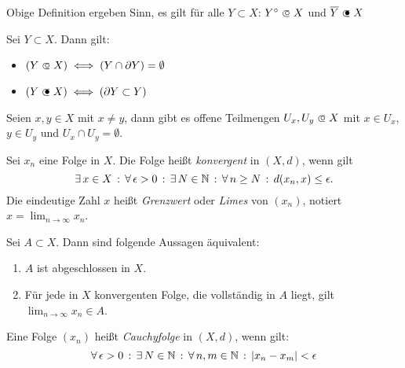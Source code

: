 \documentclass{cheat-sheet}
\begin{document}
\begin{satz}
  Obige Definition ergeben Sinn, \dh{} es gilt für alle $Y \subset X$: $Y^{\circ} \opn X$ und $\overline{Y} \cls X$
\end{satz}


\begin{satz}
  Sei $Y \subset X$. Dann gilt:
  \begin{multicols}{2}
    \begin{itemize}
      \item $(Y \opn X) \iff (Y \cap \partial Y) = \emptyset$
      \item $(Y \cls X) \iff (\partial Y \subset Y)$
    \end{itemize}
  \end{multicols}
\end{satz}

\begin{satz}
  Seien $x, y \in X$ mit $x \not= y$, dann gibt es offene Teilmengen $U_x, U_y \opn X$ mit $x \in U_x$, $y \in U_y$ und $U_x \cap U_y = \emptyset$.
\end{satz}

\begin{defn}
  Sei $x_n$ eine Folge in $X$. Die Folge heißt \emph{konvergent} in $(X, d)$, wenn gilt
  \[ \exists \, {x \in X} \,:\, \forall \, {\epsilon > 0} \,:\, \exists \, {N \in \mathbb{N}} \,:\, \forall \, {n \ge N} \,:\, d(x_n, x) \le \epsilon. \]
  Die eindeutige Zahl $x$ heißt \emph{Grenzwert} oder \emph{Limes} von $(x_n)$, notiert $x = \lim_{n \to \infty} x_n$.
\end{defn}

\begin{satz}
  Sei $A \subset X$. Dann sind folgende Aussagen äquivalent:
  \begin{enumerate}
    \item $A$ ist abgeschlossen in $X$.
    \item Für jede in $X$ konvergenten Folge, die vollständig in $A$ liegt, gilt $\lim_{n \to \infty} x_n \in A$.
  \end{enumerate}
\end{satz}

\begin{defn}
  Eine Folge $(x_n)$ heißt \emph{Cauchyfolge} in $(X, d)$, wenn gilt:
  \[ \forall \, {\epsilon > 0} \,:\, \exists \, {N \in \mathbb{N}} \,:\, \forall \, {n, m \in \mathbb{N}} \,:\, \lvert x_n - x_m\rvert < \epsilon \]
\end{defn}
\end{document}
